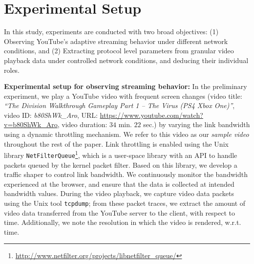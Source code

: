 \section{Experimental Setup}
\label{chap03s1:sec:experiments}

In this study, experiments are conducted with two broad objectives: (1) Observing YouTube's adaptive streaming behavior under different network conditions, and (2) Extracting protocol level parameters from granular video playback data under controlled network conditions, and deducing their individual roles.

{\bf Experimental setup for observing streaming behavior:} In the preliminary experiment, we play a YouTube video with frequent screen changes (video title: {\em ``The Division Walkthrough Gameplay Part 1 -- The Virus (PS4 Xbox One)''}, video ID: {\em b80ShWk\_Aro}, URL: \url{https://www.youtube.com/watch?v=b80ShWk_Aro}, video duration: $34$ min. $22$ sec.) by varying the link bandwidth using a dynamic throttling mechanism.
We refer to this video as our {\it sample video} throughout the rest of the paper.
Link throttling is enabled using the Unix library \texttt{NetFilterQueue}\footnote{\url{http://www.netfilter.org/projects/libnetfilter_queue/}}, which is a user-space library with an API to handle packets queued by the kernel packet filter.
Based on this library, we develop a traffic shaper to control link bandwidth.
We continuously monitor the bandwidth experienced at the browser, and ensure that the data is collected at intended bandwidth values.
During the video playback, we capture video data packets using the Unix tool \texttt{tcpdump}; from these packet traces, we extract the amount of video data transferred from the YouTube server to the client, with respect to time.
Additionally, we note the resolution in which the video is rendered, w.r.t. time.

